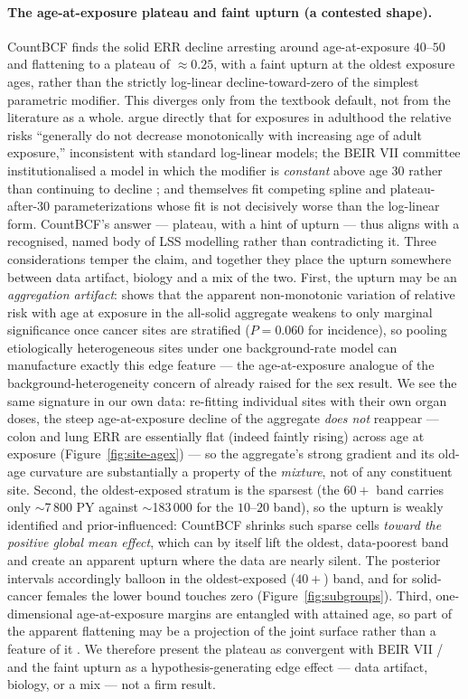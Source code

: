 \documentclass[11pt]{article}
\begin{document}
\paragraph{The age-at-exposure plateau and faint upturn (a contested
shape).} CountBCF finds the solid ERR decline arresting around
age-at-exposure $40$--$50$ and flattening to a plateau of $\approx 0.25$,
with a faint upturn at the oldest exposure ages, rather than the strictly
log-linear decline-toward-zero of the simplest parametric modifier. This
diverges only from the textbook default, not from the literature as a whole.
\citet{shuryak2010} argue directly that for exposures in adulthood the
relative risks ``generally do not decrease monotonically with increasing age
of adult exposure,'' inconsistent with standard log-linear models; the BEIR
VII committee institutionalised a model in which the modifier is
\emph{constant} above age $30$ rather than continuing to decline
\citep{beirvii2006}; and \citet{grant2017} themselves fit competing
spline and plateau-after-$30$ parameterizations whose fit is not decisively
worse than the log-linear form. CountBCF's answer --- plateau, with a hint of
upturn --- thus aligns with a recognised, named body of LSS modelling rather
than contradicting it. Three considerations temper the claim, and together
they place the upturn somewhere between data artifact, biology and a mix of
the two. First, the upturn may be an \emph{aggregation artifact}:
\citet{little2009} shows that the apparent non-monotonic variation of relative
risk with age at exposure in the all-solid aggregate weakens to only marginal
significance once cancer sites are stratified ($P=0.060$ for incidence), so
pooling etiologically heterogeneous sites under one background-rate model can
manufacture exactly this edge feature --- the age-at-exposure analogue of the
background-heterogeneity concern of \citet{cologne2019} already raised for the
sex result. We see the same signature in our own data: re-fitting individual
sites with their own organ doses, the steep age-at-exposure decline of the
aggregate \emph{does not} reappear --- colon and lung ERR are essentially flat
(indeed faintly rising) across age at exposure
(Figure~\ref{fig:site-agex}) --- so the aggregate's strong
gradient and its old-age curvature are substantially a property of the
\emph{mixture}, not of any constituent site. Second, the oldest-exposed
stratum is the sparsest (the $60+$ band
carries only $\sim$7\,800 PY against $\sim$183\,000 for the $10$--$20$ band),
so the upturn is weakly identified and prior-influenced: CountBCF shrinks such
sparse cells \emph{toward the positive global mean effect}, which can by
itself lift the oldest, data-poorest band and create an apparent upturn where
the data are nearly silent. The posterior intervals accordingly balloon in the
oldest-exposed ($40+$) band, and for solid-cancer females the lower bound
touches zero (Figure~\ref{fig:subgroups}). Third, one-dimensional
age-at-exposure margins are entangled with attained age, so part of the
apparent flattening may be a projection of the joint surface rather than a
feature of it \citep{grant2017}. We therefore present the plateau as
convergent with BEIR VII / \citet{shuryak2010} and the faint upturn as a
hypothesis-generating edge effect --- data artifact, biology, or a mix --- not
a firm result.
\end{document}
